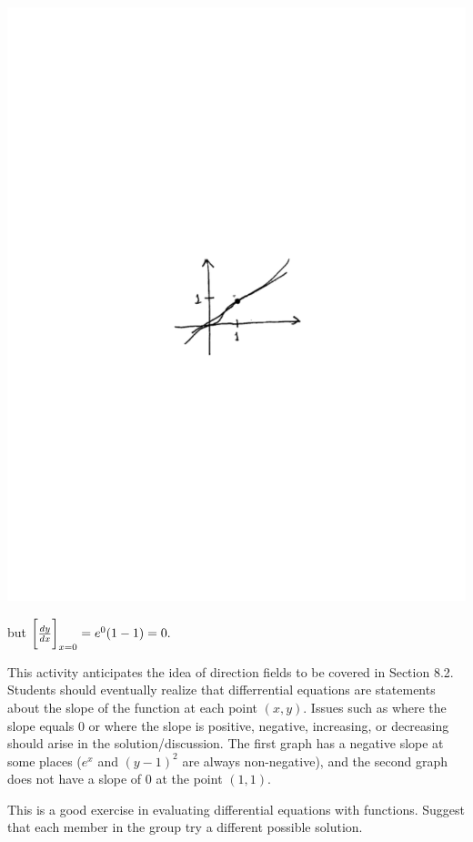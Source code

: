 \documentclass[noinstructornotes]{ximera}
\begin{document}
\begin{problem}
\begin{problem}
\begin{freeResponse}
	\begin{image}
	\includegraphics[trim= 170 330 190 330, scale=1]{Figure8-1-3.pdf}	
	\end{image}
	
	but $\eval{\dd[y]{x}}_{x=0} = e^0(1-1) = 0.$
	\end{freeResponse}

\end{problem}

\begin{instructorNotes}
This activity anticipates the idea of direction fields to be covered in Section 8.2.  
Students should eventually realize that differrential equations are statements about the slope of the function at each point $(x,y)$.  
Issues such as where the slope equals $0$ or where the slope is positive, negative, increasing, or decreasing should arise in the solution/discussion.  
The first graph has a negative slope at some places ($e^x$ and $(y-1)^2$ are always non-negative), and the second graph does not have a slope of $0$ at the point $(1,1)$.  
\end{instructorNotes}

\begin{instructorNotes}
This is a good exercise in evaluating differential equations with functions.  
Suggest that each member in the group try a different possible solution.
\end{instructorNotes}

\end{problem}
\end{document}
